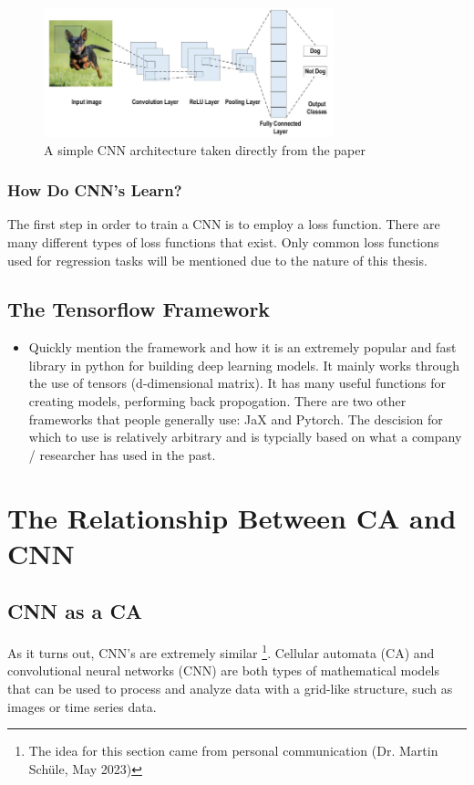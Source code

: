 \begin{figure}
	\includegraphics[width=0.75\textwidth]{../Figures/classical_cnn.png}
	\centering
	\caption[CNN]{A simple CNN architecture taken directly from the  paper \cite{alzubaidi2021review}} 
	\label{simple_cnn}
\end{figure}

\subsubsection*{How Do CNN's Learn?}
The first step in order to train a CNN is to employ a loss function. There are many different types of loss functions that exist. Only common loss functions used for regression tasks will be mentioned due to the nature of this thesis.


\subsection{The Tensorflow Framework}
\begin{itemize}
	\item Quickly mention the framework and how it is an extremely popular and fast library in python for building deep learning models. It mainly works through the use of tensors (d-dimensional matrix). It has many useful functions for creating models, performing back propogation. There are two other frameworks that people generally use: JaX and Pytorch. The descision for which to use is relatively arbitrary and is typcially based on what a company / researcher has used in the past.
\end{itemize}

\section{The Relationship Between CA and CNN}
\subsection{CNN as a CA}
As it turns out, CNN's are extremely similar \footnote{The idea for this section came from personal communication (Dr. Martin Schüle, May 2023)}. Cellular automata (CA) and convolutional neural networks (CNN) are both types of mathematical models that can be used to process and analyze data with a grid-like structure, such as images or time series data. \cite{PhysRevE.100.032402}

